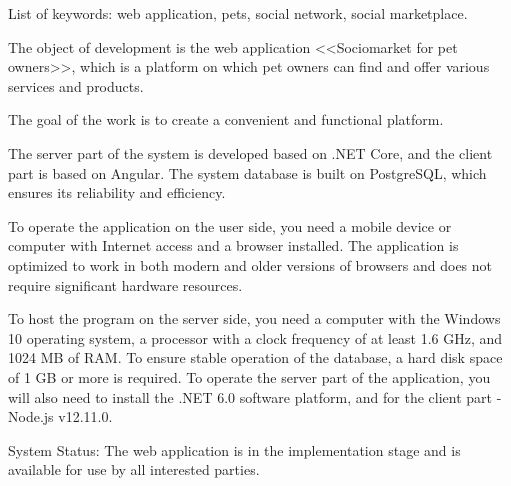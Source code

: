 List of keywords: web application, pets, social network, social marketplace.

The object of development is the web application <<Sociomarket for pet owners>>, which is a platform on which pet owners can find and offer various services and products.

The goal of the work is to create a convenient and functional platform.

The server part of the system is developed based on .NET Core, and the client part is based on Angular. The system database is built on PostgreSQL, which ensures its reliability and efficiency.

To operate the application on the user side, you need a mobile device or computer with Internet access and a browser installed. The application is optimized to work in both modern and older versions of browsers and does not require significant hardware resources.

To host the program on the server side, you need a computer with the Windows 10 operating system, a processor with a clock frequency of at least 1.6 GHz, and 1024 MB of RAM. To ensure stable operation of the database, a hard disk space of 1 GB or more is required. To operate the server part of the application, you will also need to install the .NET 6.0 software platform, and for the client part -\- Node.js v12.11.0.

System Status: The web application is in the implementation stage and is available for use by all interested parties.

